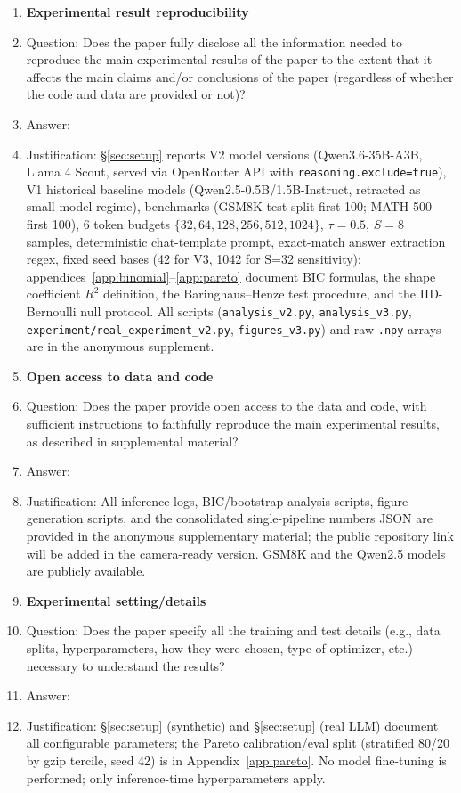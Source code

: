 \documentclass{article}
\begin{document}
\begin{enumerate}
\item {\bf Experimental result reproducibility}
    \item[] Question: Does the paper fully disclose all the information needed to reproduce the main experimental results of the paper to the extent that it affects the main claims and/or conclusions of the paper (regardless of whether the code and data are provided or not)?
    \item[] Answer: \answerYes{}
    \item[] Justification: \S\ref{sec:setup} reports V2 model versions (Qwen3.6-35B-A3B, Llama 4 Scout, served via OpenRouter API with \texttt{reasoning.exclude=true}), V1 historical baseline models (Qwen2.5-0.5B/1.5B-Instruct, retracted as small-model regime), benchmarks (GSM8K test split first 100; MATH-500 first 100), 6 token budgets $\{32,64,128,256,512,1024\}$, $\tau{=}0.5$, $S{=}8$ samples, deterministic chat-template prompt, exact-match answer extraction regex, fixed seed bases (42 for V3, 1042 for S=32 sensitivity); appendices~\ref{app:binomial}--\ref{app:pareto} document BIC formulas, the shape coefficient $R^2$ definition, the Baringhaus--Henze test procedure, and the IID-Bernoulli null protocol.  All scripts (\texttt{analysis\_v2.py}, \texttt{analysis\_v3.py}, \texttt{experiment/real\_experiment\_v2.py}, \texttt{figures\_v3.py}) and raw \texttt{.npy} arrays are in the anonymous supplement.

\item {\bf Open access to data and code}
    \item[] Question: Does the paper provide open access to the data and code, with sufficient instructions to faithfully reproduce the main experimental results, as described in supplemental material?
    \item[] Answer: \answerYes{}
    \item[] Justification: All inference logs, BIC/bootstrap analysis scripts, figure-generation scripts, and the consolidated single-pipeline numbers JSON are provided in the anonymous supplementary material; the public repository link will be added in the camera-ready version. GSM8K and the Qwen2.5 models are publicly available.

\item {\bf Experimental setting/details}
    \item[] Question: Does the paper specify all the training and test details (e.g., data splits, hyperparameters, how they were chosen, type of optimizer, etc.) necessary to understand the results?
    \item[] Answer: \answerYes{}
    \item[] Justification: \S\ref{sec:setup} (synthetic) and \S\ref{sec:setup} (real LLM) document all configurable parameters; the Pareto calibration/eval split (stratified 80/20 by gzip tercile, seed 42) is in Appendix~\ref{app:pareto}. No model fine-tuning is performed; only inference-time hyperparameters apply.


\end{enumerate}
\end{document}
